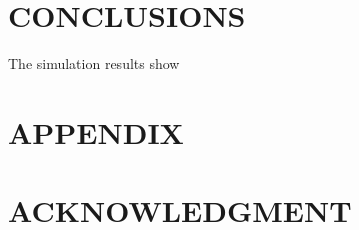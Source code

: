 \documentclass[letterpaper, 10 pt, conference]{ieeeconf}  %
\begin{document}
\section{CONCLUSIONS}

The simulation results show








\section*{APPENDIX}



\section*{ACKNOWLEDGMENT}







	
\end{document}

